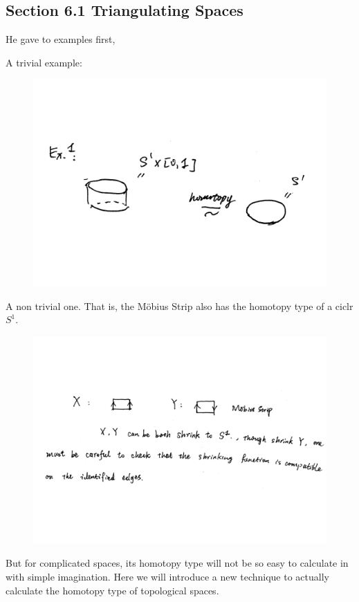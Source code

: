 \subsection{Section 6.1 Triangulating Spaces}
\label{sec:Triangulating-Spaces}

He gave to examples first,
\begin{ex}
    A trivial example:
    \begin{figure}[H]
        \centering
        \includegraphics[width=0.6\linewidth]{pics/ch6-scanned-notes-1/ex1.pdf}
    \end{figure}
\end{ex}
\begin{ex}
    A non trivial one. That is, the M\"obius Strip also has the
    homotopy type of a ciclr $S^1$.
    \begin{figure}[H]
        \centering
        \includegraphics[width=0.8\linewidth]{pics/ch6-scanned-notes-1/ex2.pdf}
    \end{figure}
\end{ex}
But for complicated spaces, its homotopy type will not be so easy to
calculate in with simple imagination. Here we will introduce a new
technique to actually calculate the homotopy type of topological
spaces.

